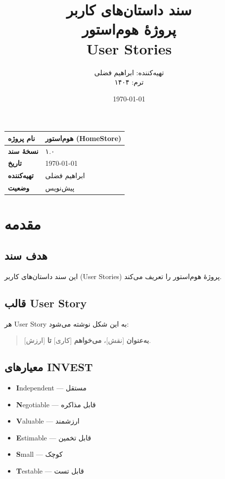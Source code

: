 \documentclass[12pt, a4paper]{article}
\title{
    \vspace{-1cm}
    \textbf{\Huge سند داستان‌های کاربر}\\[0.3cm]
    \textbf{\LARGE پروژهٔ هوم‌استور}\\[0.5cm]
    \large User Stories
}
\author{
    تهیه‌کننده: ابراهیم فضلی\\
    ترم: ۱۴۰۴
}
\date{\today}
\begin{document}
\maketitle
\thispagestyle{empty}

\vspace{1cm}

\begin{center}
\begin{tabular}{|l|l|}
\hline
\textbf{نام پروژه} & هوم‌استور (HomeStore) \\
\hline
\textbf{نسخهٔ سند} & ۱.۰ \\
\hline
\textbf{تاریخ} & \today \\
\hline
\textbf{تهیه‌کننده} & ابراهیم فضلی \\
\hline
\textbf{وضعیت} & پیش‌نویس \\
\hline
\end{tabular}
\end{center}

\newpage
\tableofcontents
\newpage

\section{مقدمه}

\subsection{هدف سند}
این سند داستان‌های کاربر (User Stories) پروژهٔ هوم‌استور را تعریف می‌کند.

\subsection{قالب User Story}
هر User Story به این شکل نوشته می‌شود:

\begin{quote}
\textbf{به‌عنوان} [نقش]، \textbf{می‌خواهم} [کاری] \textbf{تا} [ارزش].
\end{quote}

\subsection{معیارهای INVEST}
\begin{itemize}
    \item \textbf{I}ndependent — مستقل
    \item \textbf{N}egotiable — قابل مذاکره
    \item \textbf{V}aluable — ارزشمند
    \item \textbf{E}stimable — قابل تخمین
    \item \textbf{S}mall — کوچک
    \item \textbf{T}estable — قابل تست
\end{itemize}
\end{document}
